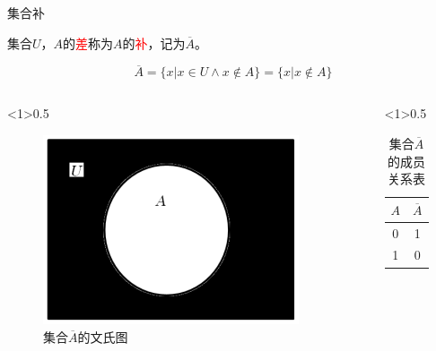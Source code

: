 \documentclass[xetex,10pt,aspectratio=43]{beamer}
\begin{document}
	\begin{frame}{集合补}
	
		集合$U$，$A$的\textcolor{red}{差}称为$A$的\textcolor{red}{补}，记为$\overline{A}$。
		
		$$\overline{A}=\{x|x\in U\wedge x\notin A\}=\{x|x\notin A\}$$
		
		\begin{columns}
			
			\begin{column}<1>{0.5\textwidth}
				
				\begin{figure}
					
					\centering
					
					\includegraphics[scale=0.5]{41.png}
					
					\caption{集合$\overline{A}$的文氏图}
					
				\end{figure}
				
			\end{column}
			
			\begin{column}<1>{0.5\textwidth}
				
				\begin{table}
					
					\centering
					
					\begin{tabular}{|c|c|}
						\hline
						$A$ & $\overline{A}$\\
						\hline
						0 & 1\\
						\hline
						1 & 0\\
						\hline
					\end{tabular}
					
					\caption{集合$\overline{A}$的成员关系表}
					
				\end{table}
				
			\end{column}
			
		\end{columns}
		
	\end{frame}
\end{document}
